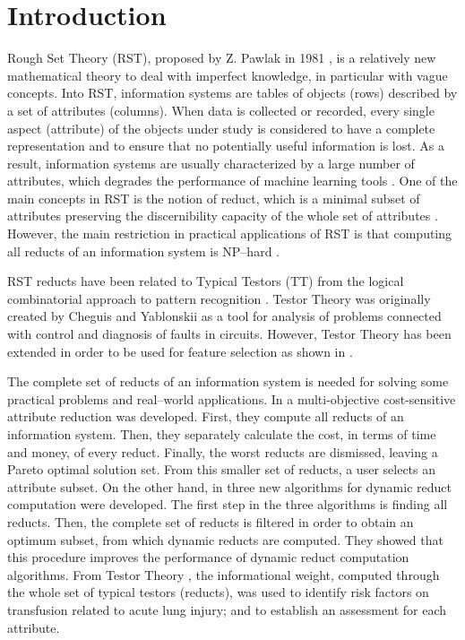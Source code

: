 \documentclass[number,preprint,review,12pt]{elsarticle}
\begin{document}
\section{Introduction}
  Rough Set Theory (RST), proposed by Z. Pawlak in 1981 \citep{Pawlak81,Pawlak81-2,Pawlak82,Pawlak91}, 
  is a relatively new mathematical theory to deal with imperfect knowledge, in particular with vague 
  concepts. Into RST, information systems are tables of objects (rows) described by a set of attributes (columns). 
  When data is collected or recorded, every single aspect (attribute) of the objects under study is
  considered to have a complete representation and to ensure that no potentially useful information is lost. As a result, information systems are usually characterized by a large number of attributes, which degrades the performance of machine learning tools \citep{Parthalain08}. One of the main concepts in RST is the notion of reduct, which is a minimal subset of attributes preserving the discernibility capacity of the whole set of attributes \citep{Pawlak91}. However, the main restriction in practical applications of RST is that computing all reducts of an information system is NP--hard \citep{Skowron92}. 
   
   RST reducts have been related to Typical Testors (TT) from the logical combinatorial approach to pattern recognition \citep{Chikalov2013}. Testor Theory was originally created by Cheguis and Yablonskii \cite{Cheguis55} as a tool for analysis of problems connected with control and diagnosis of faults in circuits.  However, Testor Theory has been extended in order to be used for feature selection as shown in \citep{Dmitriev1966,Martinez01,Ruiz08}.

  The complete set of reducts of an information system is needed for solving some practical problems and real--world applications. In \cite{Xu2013} a multi-objective cost-sensitive attribute reduction was developed. First, they compute all reducts of an information system. Then, they separately calculate the cost, in terms of time and money, of every reduct. Finally, the worst reducts are dismissed, leaving a Pareto optimal solution set. From this smaller set of reducts, a user selects an attribute subset. On the other hand, in \cite{Mukamakuza2014} three new algorithms for dynamic reduct computation were developed. The first step in the three algorithms is finding all reducts. Then, the complete set of reducts is filtered in order to obtain an optimum subset, from which dynamic reducts are computed. They showed that this procedure improves the performance of dynamic reduct computation algorithms. From Testor Theory \cite{Torres2014}, the informational weight, computed through the whole set of typical testors (reducts), was used to identify risk factors on transfusion related to acute lung injury; and to establish an assessment for each attribute.  
  
\end{document}

